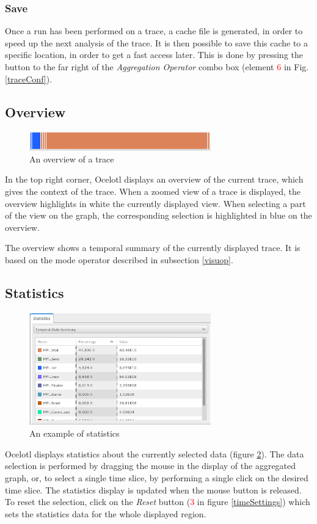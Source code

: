 \documentclass[twoside]{article}
\begin{document}
\begin{sloppypar}
\subsubsection{Save}
Once a run has been performed on a trace, a cache file is generated, in order to speed up the next analysis of the trace. It is then possible to save this cache to a specific location, in order to get a fast access later. This is done by pressing the button to the far right of the \textit{Aggregation Operator} combo box (element \textcolor{red}{6} in Fig. \ref{traceConf}).

\subsection{Overview}
\begin{figure}[h!]
	\centering
	\includegraphics[width=0.7\textwidth]{images/overview.png}
	\caption{An overview of a trace}
	\label{stats}
\end{figure}
In the top right corner, Ocelotl displays an overview of the current trace, which gives the context of the trace. When a zoomed view of a trace is displayed, the overview highlights in white the currently displayed view. When selecting a part of the view on the graph, the corresponding selection is highlighted in blue on the overview.

The overview shows a temporal summary of the currently displayed trace. It is based on the mode operator described in subsection \ref{visuop}.

\subsection{Statistics}
\begin{figure}[h!]
	\centering
	\includegraphics[width=0.7\textwidth]{images/statistics.png}
	\caption{An example of statistics}
	\label{stats}
\end{figure}
Ocelotl displays statistics about the currently selected data (figure \ref{stats}). The data selection is performed by dragging the mouse in the display of the aggregated graph, or, to select a single time slice, by performing a single click on the desired time slice. The statistics display is updated when the mouse button is released. To reset the selection, click on the \textit{Reset} button (\textcolor{red}{3} in figure \ref{timeSettings}) which sets the statistics data for the whole displayed region. 


\end{sloppypar}
\end{document}
